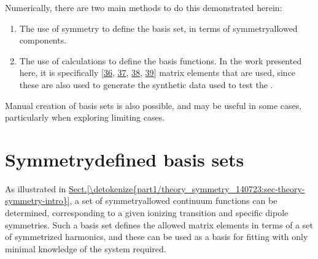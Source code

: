 \documentclass[letterpaper,table,10pt,english]{jupyterBook}
\begin{document}
\sphinxAtStartPar
Numerically, there are two main methods to do this demonstrated herein:
\begin{enumerate}
%
\item {} 
\sphinxAtStartPar
The use of symmetry to define the basis set, in terms of symmetry\sphinxhyphen{}allowed components.

\item {} 
\sphinxAtStartPar
The use of  calculations to define the basis functions. In the work presented here, it is specifically  {[}\hyperlink{cite.backmatter/bibliography:id762}{36}, \hyperlink{cite.backmatter/bibliography:id626}{37}, \hyperlink{cite.backmatter/bibliography:id803}{38}, \hyperlink{cite.backmatter/bibliography:id765}{39}{]} matrix elements that are used, since these are also used to generate the synthetic data used to test the {\hyperref[\detokenize{backmatter/glossary:term-bootstrap-retrieval-protocol}]{}}.

\end{enumerate}

\sphinxAtStartPar
Manual creation of basis sets is also possible, and may be useful in some cases, particularly when exploring limiting cases.


\section{Symmetry\sphinxhyphen{}defined basis sets}
\label{\detokenize{part2/sym-fitting-intro_240723:symmetry-defined-basis-sets}}
\sphinxAtStartPar
As illustrated in \hyperref[\detokenize{part1/theory_symmetry_140723:sec-theory-symmetry-intro}]{Sect.\@ \ref{\detokenize{part1/theory_symmetry_140723:sec-theory-symmetry-intro}}}, a set of symmetry\sphinxhyphen{}allowed continuum functions can be determined, corresponding to a given ionizing transition and specific dipole symmetries. Such a basis set defines the allowed matrix elements in terms of a set of symmetrized harmonics, and these can be used as a basis for fitting with only minimal knowledge of the system required.
\end{document}
